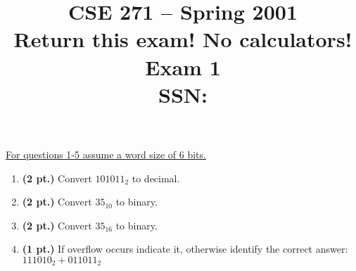 \documentclass{article}
\begin{document}
\newcommand{\SOPmin}{${\rm SOP}_{\rm min} \ $}
\newcommand{\POSmin}{${\rm POS}_{\rm min} \ $}
\newcommand{\bs}{\backslash}


\title{
\Huge{CSE 271 -- Spring 2001}\\
\normalsize{Return this exam!  No calculators!}\\
\normalsize{Exam 1}\\
SSN:}
\date{}

\maketitle{}

\underline{For questions 1-5 assume a word size of 6 bits.}
\

\begin{enumerate}
\item {\bf (2 pt.)} Convert $101011_2$ to decimal.

\item {\bf (2 pt.)} Convert $35_{10}$ to binary.

\item {\bf (2 pt.)} Convert $35_{16}$ to binary.
\pagebreak
\item {\bf (1 pt.)} If overflow occurs indicate it, otherwise identify
the correct answer: $111010_2 + 011011_2$


\end{enumerate}
\end{document}
